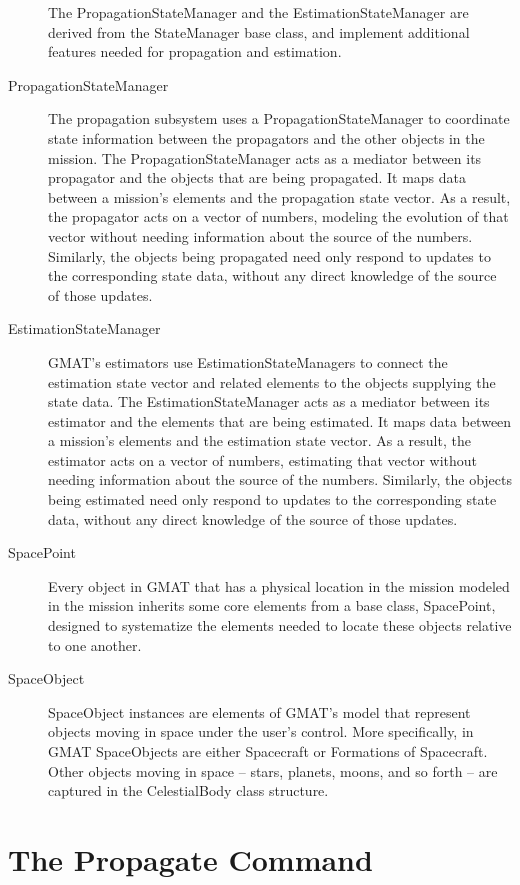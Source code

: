 \documentclass[10pt]{article}
\begin{document}
\begin{description}
The PropagationStateManager and the EstimationStateManager are derived from the StateManager base
class, and implement additional features needed for propagation and estimation.
\item[PropagationStateManager]  The propagation subsystem uses a PropagationStateManager to
coordinate state information between the propagators and the other objects in the mission.  The
PropagationStateManager acts as a mediator between its propagator and the objects that are being
propagated.  It maps data between a mission's elements and the propagation state vector.   As a
result, the propagator acts on a vector of numbers, modeling the evolution of that vector without
needing information about the source of the numbers.  Similarly, the objects being propagated need
only respond to updates to the corresponding state data, without any direct knowledge of the source
of those updates.
\item[EstimationStateManager]  GMAT's estimators use EstimationStateManagers to connect the
estimation state vector and related elements to the objects supplying the state data.  The
EstimationStateManager acts as a mediator between its estimator and the elements that are being
estimated.  It maps data between a mission's elements and the estimation state vector.   As a
result, the estimator acts on a vector of numbers, estimating that vector without needing
information about the source of the numbers.  Similarly, the objects being estimated need only
respond to updates to the corresponding state data, without any direct knowledge of the source of
those updates.
\item[SpacePoint]  Every object in GMAT that has a physical location in the mission modeled in the
mission inherits some core elements from a base class, SpacePoint, designed to systematize the
elements needed to locate these objects relative to one another.
\item[SpaceObject]  SpaceObject instances are elements of GMAT's model that represent objects moving
in space under the user's control.  More specifically, in GMAT SpaceObjects are either Spacecraft or
Formations of Spacecraft.  Other objects moving in space -- stars, planets, moons, and so forth --
are captured in the CelestialBody class structure.
\end{description}

\section{The Propagate Command}
\end{document}
